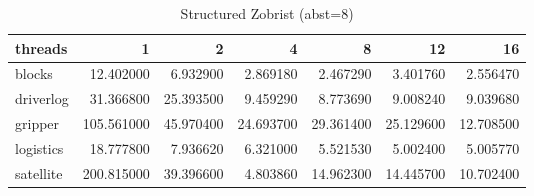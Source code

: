 \documentclass[uplatex]{article}
\begin{document}
\begin{table}[h]
	\caption{Structured Zobrist (abst=8)}
	\centering
	\begin{tabular}{lrrrrrr} \hline
		threads & 1 & 2 & 4 & 8 & 12 & 16 \\ \hline
		blocks & 12.402000 & 6.932900 & 2.869180 & 2.467290 & 3.401760 & 2.556470 \\
		driverlog & 31.366800 & 25.393500 & 9.459290 & 8.773690 & 9.008240 & 9.039680 \\
		gripper & 105.561000 & 45.970400 & 24.693700 & 29.361400 & 25.129600 & 12.708500 \\
		logistics & 18.777800 & 7.936620 & 6.321000 & 5.521530 & 5.002400 & 5.005770 \\
		satellite & 200.815000 & 39.396600 & 4.803860 & 14.962300 & 14.445700 & 10.702400
	\end{tabular}
\end{table}
\end{document}
